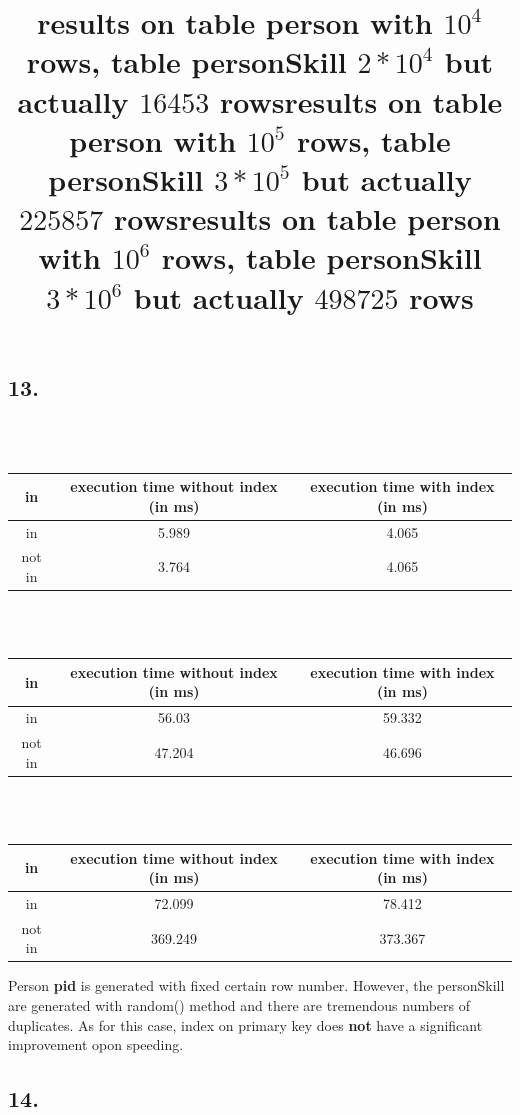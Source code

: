 \documentclass[10pt]{article}
\begin{document}
\subsection*{13.}

\begin{center}
\title{results on table person with $10^4$ rows, table personSkill $2*10^4$ but actually $16453$ rows}
\\ \hspace*{\fill} \\
\begin{tabular}{c|c|c}

\hline
[not] in & execution time without index (in ms) & execution time with index (in ms) \\ \hline
in & 5.989  & 4.065 \\
not in & 3.764 & 4.065 \\

\hline
\end{tabular}
\end{center}



\begin{center}
\title{results on table person with $10^5$ rows, table personSkill $3*10^5$ but actually $225857$ rows}
\\ \hspace*{\fill} \\
\begin{tabular}{c|c|c}
\hline
[not] in & execution time without index (in ms) & execution time with index (in ms) \\ \hline
in & 56.03  & 59.332 \\
not in & 47.204 & 46.696 \\

\hline
\end{tabular}
\end{center}



\begin{center}
\title{results on table person with $10^6$ rows, table personSkill $3*10^6$ but actually $498725$ rows}
\\ \hspace*{\fill} \\
\begin{tabular}{c|c|c}
\hline
[not] in & execution time without index (in ms) & execution time with index (in ms) \\ \hline
in & 72.099  & 78.412 \\
not in & 369.249 & 373.367 \\

\hline
\end{tabular}
\end{center}
Person \textbf{pid} is generated with fixed certain row number. However, the personSkill are generated with random() method and there are tremendous numbers of duplicates. As for this case, index on primary key does \textbf{not} have a significant improvement opon speeding.
\subsection*{14.}
\end{document}
